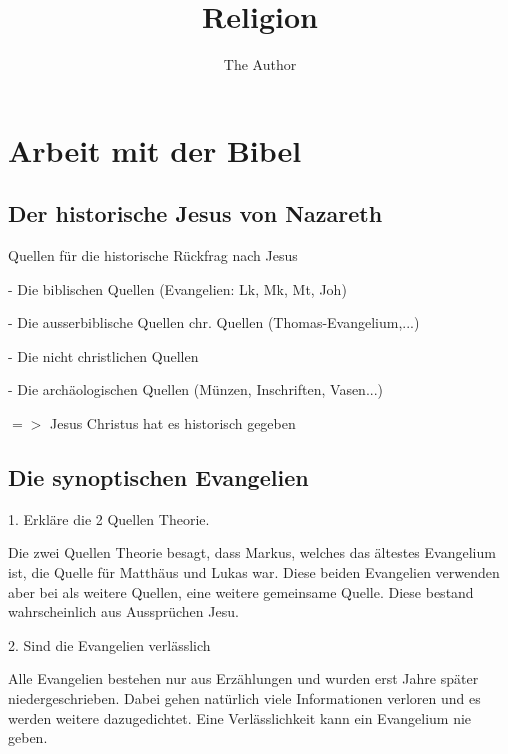 \documentclass[11pt, oneside]{article}   	%
\title{Religion}
\author{The Author}
\begin{document}
\maketitle
\pagebreak

\section{Arbeit mit der Bibel}
\subsection{Der historische Jesus von Nazareth}

Quellen f\"ur die historische R\"uckfrag nach Jesus

\vspace{0.5cm}

- Die biblischen Quellen (Evangelien: Lk, Mk, Mt, Joh)

- Die ausserbiblische Quellen chr. Quellen (Thomas-Evangelium,...)

- Die nicht christlichen Quellen

- Die arch\"aologischen Quellen (M\"unzen, Inschriften, Vasen...)

$=>$ Jesus Christus hat es historisch gegeben


\pagebreak


\subsection{Die synoptischen Evangelien}

1. Erkl\"are die 2 Quellen Theorie.

Die zwei Quellen Theorie besagt, dass Markus, welches das \"altestes Evangelium ist, die Quelle f\"ur Matth\"aus und Lukas war. Diese beiden Evangelien verwenden aber bei als weitere Quellen, eine weitere gemeinsame Quelle. Diese bestand wahrscheinlich aus Ausspr\"uchen Jesu.

\vspace{0.5cm}

2. Sind die Evangelien verl\"asslich

Alle Evangelien bestehen nur aus Erz\"ahlungen und wurden erst Jahre sp\"ater niedergeschrieben. Dabei gehen nat\"urlich viele Informationen verloren und es werden weitere dazugedichtet. Eine Verl\"asslichkeit kann ein Evangelium nie geben. 


\pagebreak
\end{document}
